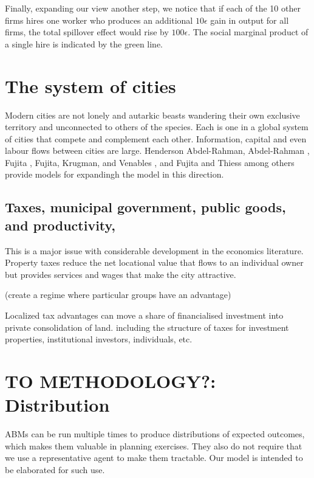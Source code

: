 Finally, expanding our view another step, we notice that if each of the  10 other firms hires one worker who produces an additional  $10\epsilon$ gain in output for all firms, the total spillover effect would rise by $100\epsilon$. The social marginal product of a single hire is indicated by the green line. 



\section{The system of cities}
Modern cities are not lonely and autarkic  beasts wandering their own exclusive territory and unconnected to others of the species. Each is one in a global system of cities that compete and complement each other. Information, capital and even labour flows between cities are large. Henderson Abdel-Rahman\cite{Henderson1972Sizes}, Abdel-Rahman \cite{abdel-rahmanAgglomerationEconomiesTypes1990}, Fujita \cite{fujitaMonopolisticCompetitionModel1988}, Fujita, Krugman, and Venables \cite{fujitaSpatialEconomyCities1999}, and Fujita and Thiess \cite{fujitaEconomicsAgglomeration1996} among others provide models for expandingh the model in this direction.



\subsection{Taxes, municipal government, public goods, and productivity,}
This is a major issue with considerable development in the economics literature. Property taxes reduce the net locational value that flows to an individual owner but provides services and wages that make the city attractive. 

(create a regime where particular groups have an advantage)

Localized tax advantages can move a share of financialised investment into private consolidation of land.
including the structure of taxes for investment properties, institutional investors, individuals, etc.




\section{TO  METHODOLOGY?: Distribution}%
ABMs can be run multiple times to produce distributions of expected outcomes, which makes them valuable in planning exercises. They also do not require that we use a representative agent to make them tractable. Our model is intended to be elaborated  for such use. 

